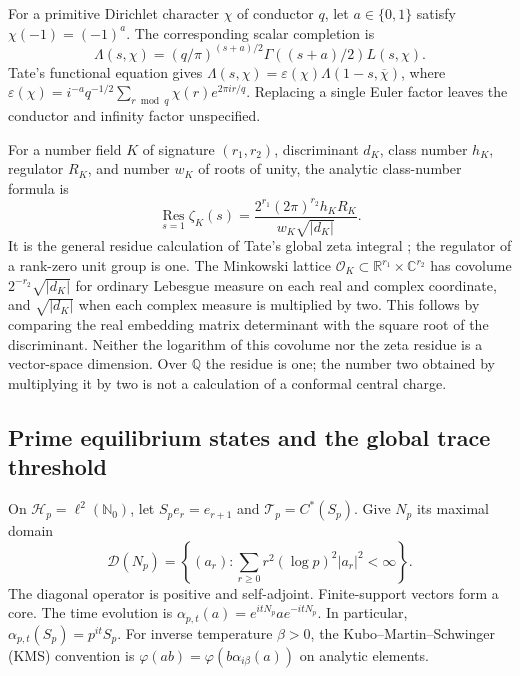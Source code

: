 For a primitive Dirichlet character $\chi$ of conductor $q$, let
$a\in\{0,1\}$ satisfy $\chi(-1)=(-1)^a$.  The corresponding scalar completion is
\[
 \Lambda(s,\chi)=(q/\pi)^{(s+a)/2}\Gamma((s+a)/2)L(s,\chi).
\]
Tate's functional equation gives
$\Lambda(s,\chi)=\varepsilon(\chi)\Lambda(1-s,\overline\chi)$,
where $\varepsilon(\chi)=i^{-a}q^{-1/2}\sum_{r\bmod q}\chi(r)e^{2\pi ir/q}$.
Replacing a single Euler factor leaves the conductor and infinity factor unspecified.

For a number field $K$ of signature $(r_1,r_2)$, discriminant $d_K$, class
number $h_K$, regulator $R_K$, and number $w_K$ of roots of unity, the
analytic class-number formula is
\[
 \operatorname*{Res}_{s=1}\zeta_K(s)
 =\frac{2^{r_1}(2\pi)^{r_2}h_KR_K}{w_K\sqrt{|d_K|}}.
\]
It is the general residue calculation of Tate's global zeta integral
\cite[\S4.4, pp.~338--339]{syn-arith:Tate}; the regulator of a rank-zero unit group
is one.  The Minkowski lattice $\mathcal O_K\subset\mathbb R^{r_1}\times
\mathbb C^{r_2}$ has covolume $2^{-r_2}\sqrt{|d_K|}$ for ordinary Lebesgue
measure on each real and complex coordinate, and $\sqrt{|d_K|}$ when each
complex measure is multiplied by two.  This follows by comparing the real
embedding matrix determinant with the square root of the discriminant.
Neither the logarithm of this covolume nor the zeta residue is a vector-space
dimension.  Over $\mathbb Q$ the residue is one; the number two obtained
by multiplying it by two is not a calculation of a conformal central charge.

\subsection{Prime equilibrium states and the global trace threshold}
\label{syn-arith:operators}

On $\mathscr H_p=\ell^2(\mathbb N_0)$, let $S_pe_r=e_{r+1}$ and
$\mathcal T_p=C^*(S_p)$.  Give $N_p$ its maximal domain
\[
 \mathcal D(N_p)=\left\{(a_r):\sum_{r\geq0}r^2(\log p)^2|a_r|^2<\infty\right\}.
\]
The diagonal operator is positive and self-adjoint.  Finite-support vectors form a core.
The time evolution is $\alpha_{p,t}(a)=e^{itN_p}ae^{-itN_p}$.
In particular, $\alpha_{p,t}(S_p)=p^{it}S_p$.
For inverse temperature $\beta>0$, the Kubo--Martin--Schwinger (KMS)
convention is $\varphi(ab)=\varphi(b\alpha_{i\beta}(a))$ on analytic elements.

